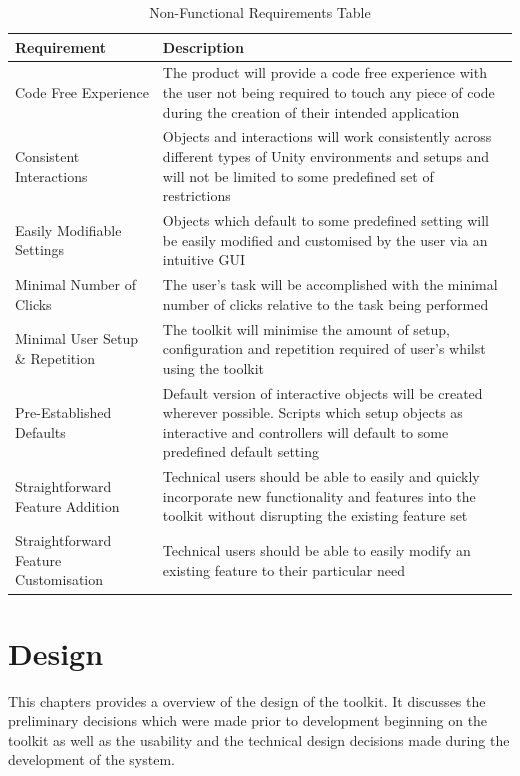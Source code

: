 \documentclass{l4proj}
\begin{document}
\begin{table}[h]
    \centering
    \begin{tabular}{ | p{5.5cm} | p{10.5cm} |}
        \hline
        Requirement & Description \\ \hline
        Code Free Experience & The product will provide a code free experience with the user not being required to touch any piece of code during the creation of their intended application \\ \hline
        Consistent Interactions & Objects and interactions will work consistently across different types of Unity environments and setups and will not be limited to some predefined set of restrictions \\ \hline
        Easily Modifiable Settings & Objects which default to some predefined setting will be easily modified and customised by the user via an intuitive GUI \\ \hline
        Minimal Number of Clicks & The user’s task will be accomplished with the minimal number of clicks relative to the task being performed \\ \hline
        Minimal User Setup \& Repetition & The toolkit will minimise the amount of setup, configuration and repetition required of user’s whilst using the toolkit \\ \hline
        Pre-Established Defaults & Default version of interactive objects will be created wherever possible. Scripts which setup objects as interactive and controllers will default to some predefined default setting \\ \hline
        Straightforward Feature Addition & Technical users should be able to easily and quickly incorporate new functionality and features into the toolkit without disrupting the existing feature set \\ \hline
        Straightforward Feature Customisation & Technical users should be able to easily modify an existing feature to their particular need \\ \hline
    \end{tabular}
    \caption{Non-Functional Requirements Table}
    \label{tab:nonfunc}
\end{table}

\chapter{Design}
This chapters provides a overview of the design of the toolkit. It discusses the preliminary decisions which were made prior to development beginning on the toolkit as well as the usability and the technical design decisions made during the development of the system. 
\end{document}
